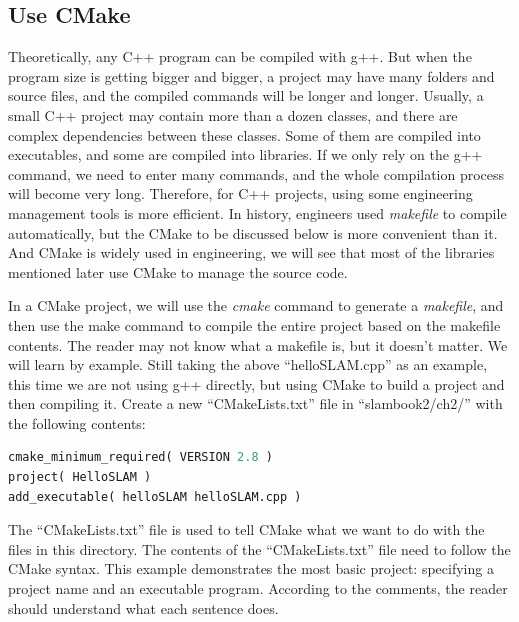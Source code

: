\subsection{Use CMake}
Theoretically, any C++ program can be compiled with g++. But when the program size is getting bigger and bigger, a project may have many folders and source files, and the compiled commands will be longer and longer. Usually, a small C++ project may contain more than a dozen classes, and there are complex dependencies between these classes. Some of them are compiled into executables, and some are compiled into libraries. If we only rely on the g++ command, we need to enter many commands, and the whole compilation process will become very long. Therefore, for C++ projects, using some engineering management tools is more efficient. In history, engineers used \textit{makefile} to compile automatically, but the CMake to be discussed below is more convenient than it. And CMake is widely used in engineering, we will see that most of the libraries mentioned later use CMake to manage the source code.

In a CMake project, we will use the \textit{cmake} command to generate a \textit{makefile}, and then use the make command to compile the entire project based on the makefile contents. The reader may not know what a makefile is, but it doesn't matter. We will learn by example. Still taking the above ``helloSLAM.cpp'' as an example, this time we are not using g++ directly, but using CMake to build a project and then compiling it. Create a new ``CMakeLists.txt'' file in ``slambook2/ch2/'' with the following contents:
\begin{lstlisting}[language=Python,caption=slambook2/ch2/CMakeLists.txt]
cmake_minimum_required( VERSION 2.8 )
project( HelloSLAM )
add_executable( helloSLAM helloSLAM.cpp )
\end{lstlisting}

The ``CMakeLists.txt'' file is used to tell CMake what we want to do with the files in this directory. The contents of the ``CMakeLists.txt'' file need to follow the CMake syntax.  This example demonstrates the most basic project: specifying a project name and an executable program. According to the comments, the reader should understand what each sentence does.

